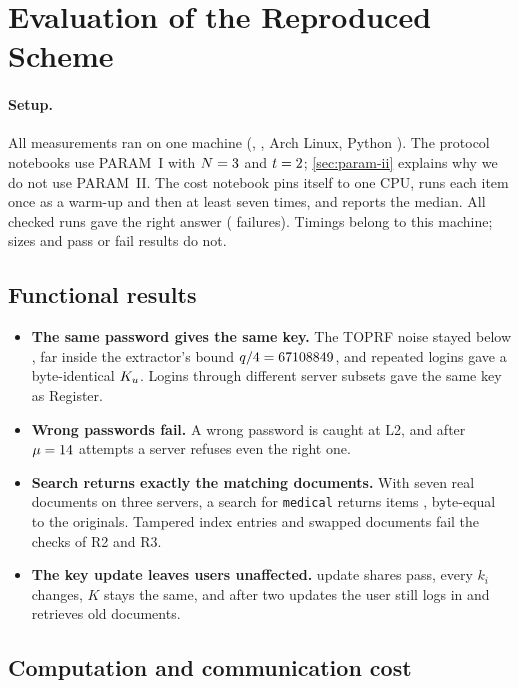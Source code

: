\section{Evaluation of the Reproduced Scheme}
\label{sec:evaluation-qpase}

\paragraph{Setup.} All measurements ran on one machine (\MachineCPU, \MachineMemory, Arch Linux, Python
\MachinePython). The protocol notebooks use PARAM~I with $N = 3$ and $t = 2$; \cref{sec:param-ii}
explains why we do not use PARAM~II. The cost notebook pins itself to one CPU, runs each item once as a warm-up and
then at least seven times, and reports the median. All \CostChecks{} checked runs gave the right answer
(\CostFailures{} failures). Timings belong to this machine; sizes and pass or fail results do not.

\subsection{Functional results}

\begin{itemize}
  \item \textbf{The same password gives the same key.} The TOPRF noise stayed below \ToprfLoginNoiseMax, far inside
        the extractor's bound $q/4 = 67108849$, and \LoginsIdentical{} repeated logins gave a byte-identical $K_u$.
        Logins through different server subsets gave the same key as Register.
  \item \textbf{Wrong passwords fail.} A wrong password is caught at L2, and after $\mu = 14$ attempts a
        server refuses even the right one.
  \item \textbf{Search returns exactly the matching documents.} With seven real documents on three servers, a
        search for \texttt{medical} returns items \RecoveredItems, byte-equal to the originals. Tampered index
        entries and swapped documents fail the checks of R2 and R3.
  \item \textbf{The key update leaves users unaffected.} \UpdateSharesAccepted{} update shares pass, every $k_i$
        changes, $K$ stays the same, and after two updates the user still logs in and retrieves old documents.
\end{itemize}

\subsection{Computation and communication cost}

